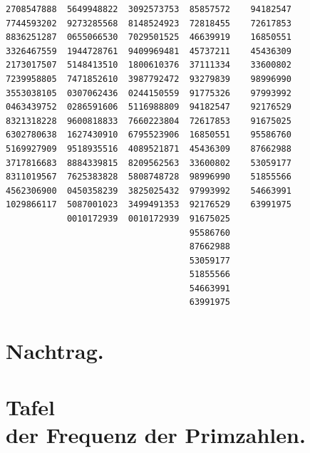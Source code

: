 \documentclass[10pt,a4paper]{article}
\begin{document}
\begin{verbatim}
2708547888  5649948822  3092573753  85857572    94182547
7744593202  9273285568  8148524923  72818455    72617853
8836251287  0655066530  7029501525  46639919    16850551
3326467559  1944728761  9409969481  45737211    45436309
2173017507  5148413510  1800610376  37111334    33600802
7239958805  7471852610  3987792472  93279839    98996990
3553038105  0307062436  0244150559  91775326    97993992
0463439752  0286591606  5116988809  94182547    92176529
8321318228  9600818833  7660223804  72617853    91675025
6302780638  1627430910  6795523906  16850551    95586760
5169927909  9518935516  4089521871  45436309    87662988
3717816683  8884339815  8209562563  33600802    53059177
8311019567  7625383828  5808748728  98996990    51855566
4562306900  0450358239  3825025432  97993992    54663991
1029866117  5087001023  3499491353  92176529    63991975
            0010172939  0010172939  91675025
                                    95586760
                                    87662988
                                    53059177
                                    51855566
                                    54663991
                                    63991975
\end{verbatim}

\newpage
\setcounter{page}{434}

\section*{Nachtrag.}

\newpage
\setcounter{page}{435}

\newpage
\setcounter{page}{436}

\section*{Tafel\\der Frequenz der Primzahlen.}

\newpage
\setcounter{page}{437}

\newpage
\setcounter{page}{438}

\newpage
\setcounter{page}{439}

\newpage
\setcounter{page}{440}
\end{document}
